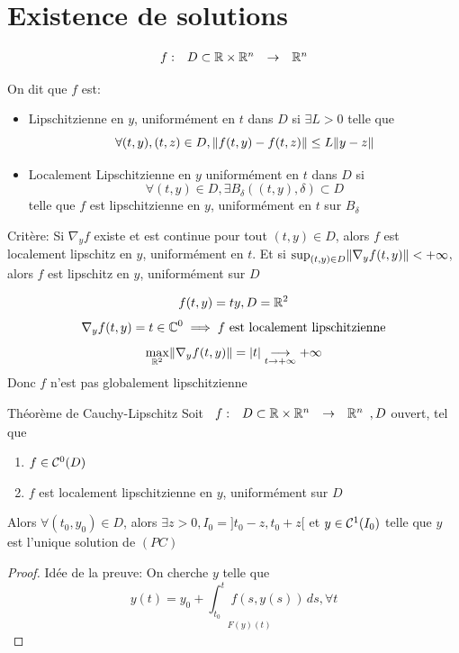 \documentclass[]{report}
\begin{document}
    \section{Existence de solutions}

    \[\begin{array}{ccccc} f : & D\subset \mathbb{R}\times \mathbb{R}^n & \to & \mathbb{R}^n \end{array}\]

    \begin{df}{}{}
        On dit que $f$ est:
        \begin{itemize}
            \item Lipschitzienne en $y$, uniformément en $t$ dans $D$ si $\exists L>0$ telle que
            \[\forall (t,y),(t,z)\in D, \lVert f(t,y)-f(t,z) \rVert\le L\lVert y-z \rVert\]
            \item Localement Lipschitzienne en $y$ uniformément en $t$ dans $D$ si
            \[\forall(t,y)\in D,\exists B_\delta((t,y),\delta)\subset D\]
            telle que $f$ est lipschitzienne en $y$, uniformément en $t$ sur $B_\delta$
        \end{itemize}
    \end{df}

    Critère: Si $\nabla_y f$ existe et est continue pour tout $(t,y)\in D$, alors $f$ est localement lipschitz en $y$, uniformément en $t$. Et si $\sup_{(t,y)\in D}\lVert \nabla_y f(t,y) \rVert<+\infty$, alors $f$ est lipschitz en $y$, uniformément sur $D$

    \begin{ex}{}{}
        \[f(t,y)=ty, D=\mathbb{R}^2\]
        \[\nabla_y f(t,y)=t \in \mathbb{C}^0\implies f\text{ est localement lipschitzienne}\]
        \[\max_{\mathbb{R}^2}\lVert \nabla_y f(t,y) \rVert=\left| t\right|\underset{t\to +\infty}{\longrightarrow} +\infty\]
        Donc $f$ n'est pas globalement lipschitzienne
    \end{ex}

    \begin{tm}{Théorème de Cauchy-Lipschitz}{}
        Soit $\begin{array}{ccccc} f : & D\subset \mathbb{R}\times \mathbb{R}^n & \to & \mathbb{R}^n \end{array}, D$ ouvert, tel que
        \begin{enumerate}
            \item $f\in \mathcal{C}^0(D)$
            \item $f$ est localement lipschitzienne en $y$, uniformément sur $D$
        \end{enumerate}
        Alors $\forall (t_0,y_0)\in D$, alors $\exists z>0, I_0=]t_0-z,t_0+z[$ et $y\in \mathcal{C}^1(I_0)$ telle que $y$ est l'unique solution de $(PC)$
    \end{tm}

    \begin{proof}
        Idée de la preuve: On cherche $y$ telle que
        \[y(t)=\underset{F(y)(t)}{y_0+\int_{t_0}^{t}f(s,y(s))\, ds}, \forall t\]
    \end{proof}
\end{document}
